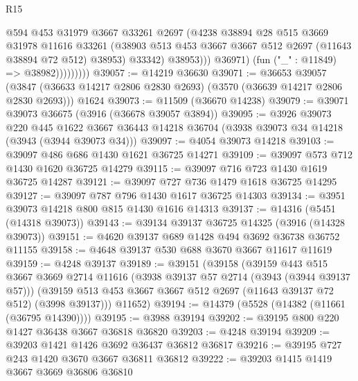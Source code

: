 \begin{lexlean}{R15}
\begin{coremodule}
                            @594
                            @453
                            @31979
                            @3667
                            @33261
                            @2697
                            (@4238
                              @38894
                              @28
                              @515
                              @3669
                              @31978
                              @11616
                              @33261
                              (@38903
                                @513
                                @453
                                @3667
                                @3667
                                @512
                                @2697
                                (@11643 @38894 @72 @512)
                                @38953)
                              @33342)
                            @38953)))
                      @36971)
                    (fun ("_" : @11849) => @38982)))))))))
@39057 := @14219 @36630
@39071 := @36653
    @39057
    (@3847 (@36633 @14217 @2806 @2830 @2693) (@3570 (@36639 @14217 @2806 @2830 @2693)))
    @1624
@39073 := @11509 (@36670 @14238)
@39079 := @39071 @39073 @36675 (@3916 (@36678 @39057 @3894))
@39095 := @3926
    @39073
    @220
    @445
    @1622
    @3667
    @36443
    @14218
    @36704
    (@3938 @39073 @34 @14218 (@3943 (@3944 @39073 @34)))
@39097 := @4054 @39073 @14218
@39103 := @39097 @486 @686 @1430 @1621 @36725 @14271
@39109 := @39097 @573 @712 @1430 @1620 @36725 @14279
@39115 := @39097 @716 @723 @1430 @1619 @36725 @14287
@39121 := @39097 @727 @736 @1479 @1618 @36725 @14295
@39127 := @39097 @787 @796 @1430 @1617 @36725 @14303
@39134 := @3951 @39073 @14218 @800 @815 @1430 @1616 @14313
@39137 := @14316 (@5451 (@14318 @39073))
@39143 := @39134 @39137 @36725 @14325 (@3916 (@14328 @39073))
@39151 := @4620 @39137 @689 @1428 @494 @3692 @36738 @36752 @11155
@39158 := @4648 @39137 @530 @688 @3670 @3667 @11617 @11619
@39159 := @4248 @39137
@39189 := @39151
    (@39158
      (@39159
        @443
        @515
        @3667
        @3669
        @2714
        @11616
        (@3938 @39137 @57 @2714 (@3943 (@3944 @39137 @57)))
        (@39159 @513 @453 @3667 @3667 @512 @2697 (@11643 @39137 @72 @512) (@3998 @39137)))
      @11652)
@39194 := @14379 (@5528 (@14382 (@11661 (@36795 @14390))))
@39195 := @3988 @39194
@39202 := @39195 @800 @220 @1427 @36438 @3667 @36818 @36820
@39203 := @4248 @39194
@39209 := @39203 @1421 @1426 @3692 @36437 @36812 @36817
@39216 := @39195 @727 @243 @1420 @3670 @3667 @36811 @36812
@39222 := @39203 @1415 @1419 @3667 @3669 @36806 @36810

\end{coremodule}
\end{lexlean}
